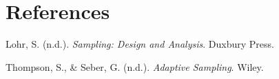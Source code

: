 \documentclass[12pt,twoside]{reedthesis}
\begin{document}
\backmatter

\hypertarget{references}{%
\chapter*{References}\label{references}}


\noindent

\setlength{\parindent}{-0.20in}
\setlength{\leftskip}{0.20in}
\setlength{\parskip}{8pt}

\hypertarget{refs}{}
\leavevmode\hypertarget{ref-lohr_sampling}{}%
Lohr, S. (n.d.). \emph{Sampling: Design and Analysis}. Duxbury Press.

\leavevmode\hypertarget{ref-thompson_adaptive}{}%
Thompson, S., \& Seber, G. (n.d.). \emph{Adaptive Sampling}. Wiley.


\end{document}
